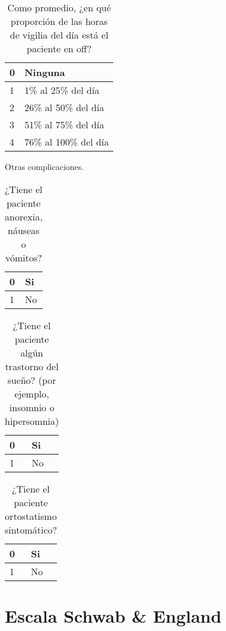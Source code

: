 \begin{table}[H]
\begin{center}
\begin{tabular}{|p{1cm}|p{11cm}|}
\hline
0 & Ninguna \\\hline
1 & 1\% al 25\% del día \\\hline
2 & 26\% al 50\% del día\\\hline
3 & 51\% al 75\% del día \\\hline
4 & 76\% al 100\% del día\\\hline
\end{tabular}
\caption{Como promedio, ¿en qué proporción de las horas de vigilia del día está el paciente en off?}
\end{center}
\end{table}

Otras complicaciones.
\begin{table}[H]
\begin{center}
\begin{tabular}{|p{1cm}|p{11cm}|}
\hline
0 & Si \\\hline
1 & No \\\hline
\end{tabular}
\caption{ ¿Tiene el paciente anorexia, náuseas o vómitos?}
\end{center}
\end{table}

\begin{table}[H]
\begin{center}
\begin{tabular}{|p{1cm}|p{11cm}|}
\hline
0 & Si \\\hline
1 & No \\\hline
\end{tabular}
\caption{¿Tiene el paciente algún trastorno del sueño? (por ejemplo, insomnio o hipersomnia)}
\end{center}
\end{table}

\begin{table}[H]
\begin{center}
\begin{tabular}{|p{1cm}|p{11cm}|}
\hline
0 & Si \\\hline
1 & No \\\hline
\end{tabular}
\caption{¿Tiene el paciente ortostatismo sintomático?}
\end{center}
\end{table}

\section{Escala Schwab \& England }

